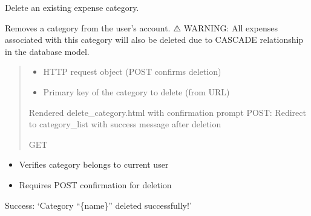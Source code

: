 \documentclass[letterpaper,10pt,english]{sphinxmanual}
\begin{document}

\begin{fulllineitems}
\label{\detokenize{expensesApp:expensesApp.views.delete_category}}
\pysigstartsignatures
\pysiglinewithargsret
{}
{\sphinxparamcomma {}}
{}
\pysigstopsignatures
\sphinxAtStartPar
Delete an existing expense category.

\sphinxAtStartPar
Removes a category from the user’s account.
⚠️ WARNING: All expenses associated with this category will also be deleted
due to CASCADE relationship in the database model.
\begin{quote}\begin{description}
\begin{itemize}
\item {} 
\sphinxAtStartPar
{} \textendash{} HTTP request object (POST confirms deletion)

\item {} 
\sphinxAtStartPar
{} \textendash{} Primary key of the category to delete (from URL)

\end{itemize}

\sphinxAtStartPar
Rendered delete\_category.html with confirmation prompt
POST: Redirect to category\_list with success message after deletion

\sphinxAtStartPar
GET

\end{description}\end{quote}
\begin{description}
\begin{itemize}
\item {} 
\sphinxAtStartPar
Verifies category belongs to current user

\item {} 
\sphinxAtStartPar
Requires POST confirmation for deletion

\end{itemize}

\sphinxAtStartPar
Success: ‘Category “\{name\}” deleted successfully!’


\end{description}
\end{fulllineitems}
\end{document}
